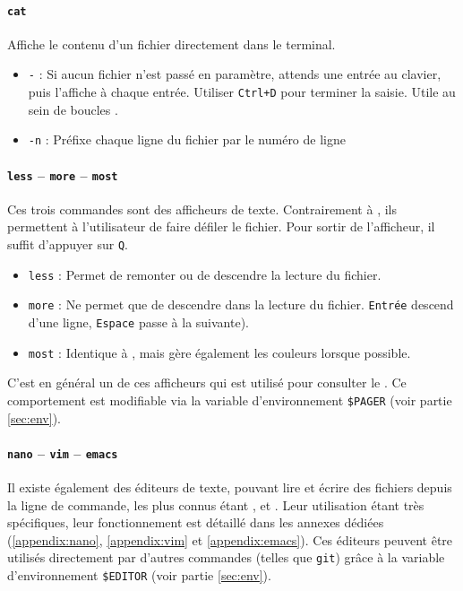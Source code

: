 \paragraph{\texttt{cat}} 
Affiche le contenu d'un fichier directement dans le terminal.
\begin{itemize}
    \item \texttt{-} : Si aucun fichier n'est passé en paramètre, attends une entrée au clavier, puis l'affiche à chaque entrée. Utiliser \texttt{Ctrl+D} pour terminer la saisie. Utile au sein de boucles .
    \item \texttt{-n} : Préfixe chaque ligne du fichier par le numéro de ligne
\end{itemize}

\paragraph{\texttt{less} -- \texttt{more} -- \texttt{most}} 
Ces trois commandes sont des afficheurs de texte. Contrairement à , ils permettent à l'utilisateur de faire défiler le fichier. Pour sortir de l'afficheur, il suffit d'appuyer sur \texttt{Q}.

\begin{itemize}
    \item \texttt{less} : Permet de remonter ou de descendre la lecture du fichier.
    \item \texttt{more} : Ne permet que de descendre dans la lecture du fichier.
    \texttt{Entrée} descend d'une ligne, \texttt{Espace} passe à la  suivante).
    \item \texttt{most} : Identique à , mais gère également les couleurs lorsque possible.
\end{itemize}\vspace{-3mm}

 C'est en général un de ces afficheurs qui est utilisé pour consulter le . Ce comportement est modifiable via la variable d'environnement \texttt{\$PAGER} (voir partie \ref{sec:env}).

\paragraph{\texttt{nano} -- \texttt{vim} -- \texttt{emacs}}
Il existe également des éditeurs de texte, pouvant lire et écrire des fichiers depuis la ligne de commande, les plus connus étant ,  et . Leur utilisation étant très spécifiques, leur fonctionnement est détaillé dans les annexes dédiées (\ref{appendix:nano}, \ref{appendix:vim} et \ref{appendix:emacs}). \newline
Ces éditeurs peuvent être utilisés directement par d'autres commandes (telles que \texttt{git}) grâce à la variable d'environnement \texttt{\$EDITOR} (voir partie \ref{sec:env}).

